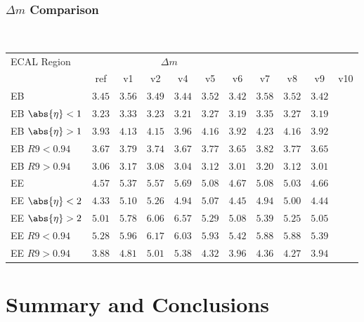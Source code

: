 \documentclass[8pt,serif]{beamer}
\begin{document}
\begin{frame}
  \frametitle{$ \Delta m$ Comparison}
\\


  
  \begin{center}
    \emph{\dataSample}\xspace \invMassVarName

\tiny \begin{tabular}{|l|c|c|c|c|c|c|c|c|c|c|} \hline  
ECAL Region & \multicolumn{6}{c|}{$\Delta m$} \\
            & ref  &  v1  & v2  &  v4  &  v5  & v6 & v7 & v8 & v9 & v10\\ 
\hline           
EB                  & $3.45$ & $3.56$ & $3.49$ & $3.44$ & $3.52$ & $3.42$ & $3.58$ & $3.52$ & $3.42$ \\
EB $\abs{\eta} < 1$ & $3.23$ & $3.33$ & $3.23$ & $3.21$ & $3.27$ & $3.19$ & $3.35$ & $3.27$ & $3.19$ \\
EB $\abs{\eta} > 1$ & $3.93$ & $4.13$ & $4.15$ & $3.96$ & $4.16$ & $3.92$ & $4.23$ & $4.16$ & $3.92$ \\
EB $R9 < 0.94$      & $3.67$ & $3.79$ & $3.74$ & $3.67$ & $3.77$ & $3.65$ & $3.82$ & $3.77$ & $3.65$ \\
EB $R9 > 0.94$      & $3.06$ & $3.17$ & $3.08$ & $3.04$ & $3.12$ & $3.01$ & $3.20$ & $3.12$ & $3.01$ \\
\hline
EE                  & $4.57$ & $5.37$ & $5.57$ & $5.69$ & $5.08$ & $4.67$ & $5.08$ & $5.03$ & $4.66$ \\
EE $\abs{\eta} < 2$ & $4.33$ & $5.10$ & $5.26$ & $4.94$ & $5.07$ & $4.45$ & $4.94$ & $5.00$ & $4.44$ \\
EE $\abs{\eta} > 2$ & $5.01$ & $5.78$ & $6.06$ & $6.57$ & $5.29$ & $5.08$ & $5.39$ & $5.25$ & $5.05$ \\
EE $R9 < 0.94$      & $5.28$ & $5.96$ & $6.17$ & $6.03$ & $5.93$ & $5.42$ & $5.88$ & $5.88$ & $5.39$ \\
EE $R9 > 0.94$      & $3.88$ & $4.81$ & $5.01$ & $5.38$ & $4.32$ & $3.96$ & $4.36$ & $4.27$ & $3.94$ \\
\hline  
\end{tabular}
\end{center}
\end{frame}
\section{Summary and Conclusions}
\end{document}
